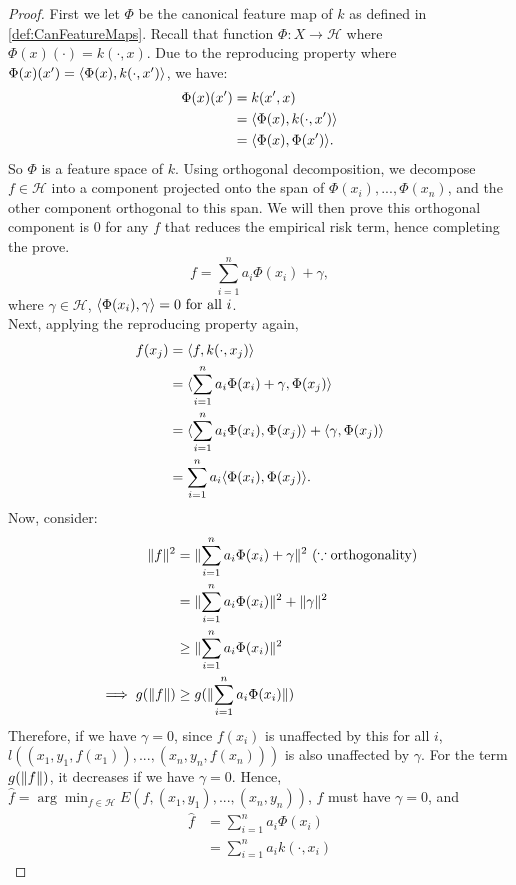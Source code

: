 \documentclass[twoside]{memoir}
\begin{document}
	\begin{proof}
		First we let $\Phi$ be the canonical feature map of $k$ as defined in \ref{def:CanFeatureMaps}. Recall that function $\Phi: X \rightarrow \mathcal{H}$ where $\Phi(x)(\cdot) = k(\cdot , x)$. Due to the reproducing property where $\Phi(x)(x') = \langle\Phi(x), k(\cdot, x')\rangle$, we have:
		\begin{equation*}
		\begin{split}
		\Phi(x)(x') &= k(x', x) \\
		&= \langle\Phi(x), k(\cdot, x')\rangle \\
		&= \langle\Phi(x), \Phi(x')\rangle. 
		\end{split}
		\end{equation*}
		So $\Phi$ is a feature space of $k$. Using orthogonal decomposition, we decompose $f \in \mathcal{H}$ into a component projected onto the span of ${\Phi(x_i), ..., \Phi(x_n)}$, and the other component orthogonal to this span. We will then prove this orthogonal component is $0$ for any $f$ that reduces the empirical risk  term, hence completing the prove.
		\[ f = \sum_{i=1}^{n} a_i \Phi(x_i) + \gamma, \]
		where $\gamma \in \mathcal{H}$, $\langle\Phi(x_i), \gamma\rangle = 0 \text{ for all } i$.\\
		Next, applying the reproducing property again,
		\begin{equation*}
		\begin{split}
		f(x_j) &= \langle f, k(\cdot, x_j)\rangle \\
		&= \langle\sum_{i=1}^{n} a_i \Phi(x_i) + \gamma, \Phi(x_j)\rangle \\
		&= \langle\sum_{i=1}^{n} a_i \Phi(x_i),  \Phi(x_j)\rangle + \langle\gamma,  \Phi(x_j)\rangle \\
		&= \sum_{i=1}^{n} a_i \langle\Phi(x_i),  \Phi(x_j)\rangle.
		\end{split}
		\end{equation*}
		Now, consider:
		\begin{equation*}
		\begin{split}
		\lVert f\rVert^2 &= \lVert\sum_{i=1}^{n} a_i \Phi(x_i) + \gamma\rVert^2 ~ (\because \text{orthogonality})\\
		&=  \lVert\sum_{i=1}^{n} a_i \Phi(x_i)\rVert^2 + \lVert\gamma\rVert^2 \\
		&\geq \lVert\sum_{i=1}^{n} a_i \Phi(x_i)\rVert^2 \\
		\implies g(\lVert f\rVert) &\geq g(\lVert\sum_{i=1}^{n} a_i \Phi(x_i)\rVert)
		\end{split}
		\end{equation*}
		Therefore, if we have $\gamma = 0$, since $f(x_i)$ is unaffected by this for all $i$, 
		$l((x_1, y_1, f(x_1)), ..., (x_n, y_n, f(x_n)))$ is also unaffected by $\gamma$. For the term $g(\lVert f\rVert)$, it decreases if we have $\gamma = 0$. Hence,  $\hat{f} = \arg \min_{f \in \mathcal{H}} E(f, (x_1, y_1), ..., (x_n, y_n))$, $\hat{f}$ must have $\gamma = 0$, and 
		\begin{equation*}
		\begin{split}
		\hat{f} &= \sum_{i=1}^{n} a_i \Phi(x_i) \\
		&=  \sum_{i=1}^{n} a_i k(\cdot, x_i)
		\end{split}
		\end{equation*}
	\end{proof}
\end{document}
